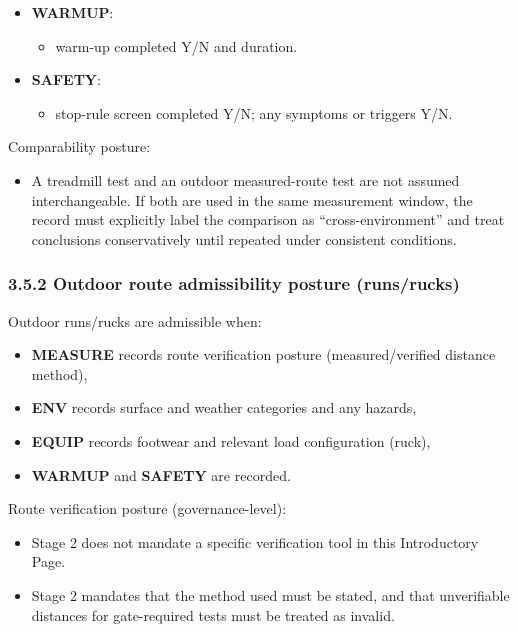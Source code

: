\documentclass[10pt]{article}
\begin{document}
\begin{itemize}
\begin{itemize}
  \item for ruck: load carried and load confirmation method, pack configuration reference at a category level, and footwear used.
  \end{itemize}
\item \textbf{WARMUP}:
  \begin{itemize}
  \item warm-up completed Y/N and duration.
  \end{itemize}
\item \textbf{SAFETY}:
  \begin{itemize}
  \item stop-rule screen completed Y/N; any symptoms or triggers Y/N.
  \end{itemize}
\end{itemize}

Comparability posture:

\begin{itemize}
\item A treadmill test and an outdoor measured-route test are not assumed interchangeable. If both are used in the same measurement window, the record must explicitly label the comparison as “cross-environment” and treat conclusions conservatively until repeated under consistent conditions.
\end{itemize}

\subsubsection*{3.5.2 Outdoor route admissibility posture (runs/rucks)}

Outdoor runs/rucks are admissible when:

\begin{itemize}
\item \textbf{MEASURE} records route verification posture (measured/verified distance method),
\item \textbf{ENV} records surface and weather categories and any hazards,
\item \textbf{EQUIP} records footwear and relevant load configuration (ruck),
\item \textbf{WARMUP} and \textbf{SAFETY} are recorded.
\end{itemize}

Route verification posture (governance-level):

\begin{itemize}
\item Stage 2 does not mandate a specific verification tool in this Introductory Page.
\item Stage 2 mandates that the method used must be stated, and that unverifiable distances for gate-required tests must be treated as invalid.
\end{itemize}
\end{document}
